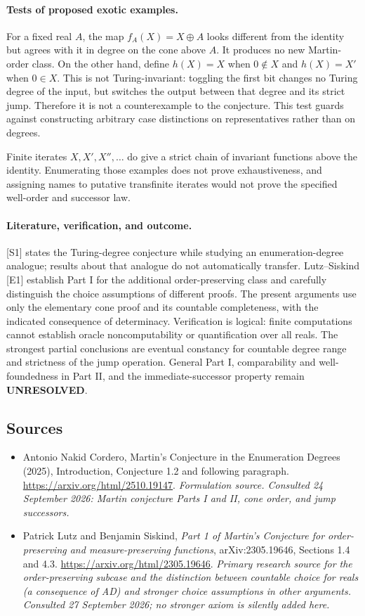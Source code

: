 \documentclass[11pt]{article}
\begin{document}
\paragraph{Tests of proposed exotic examples.}
For a fixed real $A$, the map $f_A(X)=X\oplus A$ looks different from
the identity but agrees with it in degree on the cone above $A$.
It produces no new Martin-order class. On the other hand, define
$h(X)=X$ when $0\notin X$ and $h(X)=X'$ when $0\in X$. This is
not Turing-invariant: toggling the first bit changes no Turing degree
of the input, but switches the output between that degree and its
strict jump. Therefore it is not a counterexample to the conjecture.
This test guards against constructing arbitrary case distinctions on
representatives rather than on degrees.

Finite iterates $X,X',X'',\ldots$ do give a strict chain of invariant
functions above the identity. Enumerating those examples does not
prove exhaustiveness, and assigning names to putative transfinite
iterates would not prove the specified well-order and successor law.

\paragraph{Literature, verification, and outcome.}
[S1] states the Turing-degree conjecture while studying an
enumeration-degree analogue; results about that analogue do not
automatically transfer. Lutz--Siskind [E1] establish Part I for the
additional order-preserving class and carefully distinguish the
choice assumptions of different proofs. The present arguments use
only the elementary cone proof and its countable completeness, with
the indicated consequence of determinacy. Verification is logical:
finite computations cannot establish oracle noncomputability or
quantification over all reals. The strongest partial conclusions are
eventual constancy for countable degree range and strictness of the
jump operation. General Part I, comparability and well-foundedness in
Part II, and the immediate-successor property remain
\textbf{UNRESOLVED}.

\subsection{Sources}
\begin{itemize}
\item[S1]Antonio Nakid Cordero, Martin's Conjecture in the Enumeration Degrees (2025), Introduction, Conjecture 1.2 and following paragraph.
\url{https://arxiv.org/html/2510.19147}.
\textit{Formulation source. Consulted 24 September 2026: Martin conjecture Parts I and II, cone order, and jump successors.}
\item[E1]Patrick Lutz and Benjamin Siskind, \emph{Part 1 of Martin's
Conjecture for order-preserving and measure-preserving functions},
arXiv:2305.19646, Sections 1.4 and 4.3.
\url{https://arxiv.org/html/2305.19646}.
\textit{Primary research source for the order-preserving subcase and
the distinction between countable choice for reals (a consequence of
AD) and stronger choice assumptions in other arguments. Consulted
27 September 2026; no stronger axiom is silently added here.}

\end{itemize}
\end{document}

